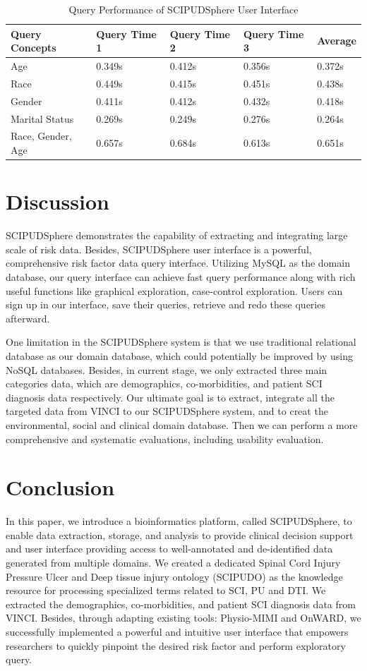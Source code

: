 \documentclass{amia}
\begin{document}
\begin{table}[!ht]
\centering
\caption{Query Performance of SCIPUDSphere User Interface}
  \begin{tabular}{|l|l|l|l|l|}
  \hline
    \textbf{Query Concepts}  & \textbf{Query Time 1} & \textbf{Query Time 2} & \textbf{Query Time 3} & \textbf{Average} \\ \hline
    Age & 0.349s & 0.412s & 0.356s & 0.372s \\ \hline
    Race & 0.449s & 0.415s & 0.451s & 0.438s \\ \hline
    Gender   & 0.411s & 0.412s & 0.432s & 0.418s \\ \hline
    Marital Status   & 0.269s & 0.249s & 0.276s & 0.264s \\ \hline
    Race, Gender, Age & 0.657s & 0.684s & 0.613s & 0.651s \\ \hline
  \end{tabular}
\end{table}

\section{Discussion}
SCIPUDSphere demonstrates the capability of extracting and integrating large scale of risk data. Besides, SCIPUDSphere user interface is a powerful, comprehensive risk factor data query interface. Utilizing MySQL as the domain database, our query interface can achieve fast query performance along with rich useful functions like graphical exploration, case-control exploration. Users can sign up in our interface, save their queries, retrieve and redo these queries afterward. 

One limitation in the SCIPUDSphere system is that we use traditional relational database as our domain database, which could potentially be improved by using NoSQL databases. Besides, in current stage, we only extracted three main categories data, which are demographics, co-morbidities, and patient SCI diagnosis data respectively. Our ultimate goal is to extract, integrate all the targeted data from VINCI to our SCIPUDSphere system, and to creat the environmental, social and clinical domain database. Then we can perform a more comprehensive and systematic evaluations, including usability evaluation. 

\section{Conclusion}
In this paper, we introduce a bioinformatics platform, called SCIPUDSphere, to enable data extraction, storage, and analysis to provide clinical decision support and user interface providing access to well-annotated and de-identified data generated from multiple domains. We created a dedicated Spinal Cord Injury Pressure Ulcer and Deep tissue injury ontology (SCIPUDO) as the knowledge resource for processing specialized terms related to SCI, PU and DTI. We extracted the demographics, co-morbidities, and patient SCI diagnosis data from VINCI. Besides, through adapting existing tools: Physio-MIMI and OnWARD, we successfully implemented a powerful and intuitive user interface that empowers researchers to quickly pinpoint the desired risk factor and perform exploratory query.
\end{document}
